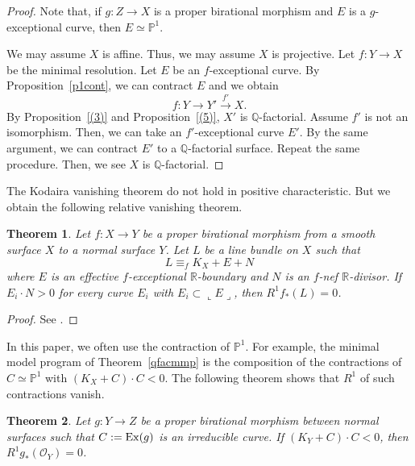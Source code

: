 \documentclass[12pt,twoside]{amsart}
\newtheorem{thm}{Theorem}[section]
\theoremstyle{definition}
\newcommand{\Q}{$\mathbb{Q}$}
\begin{document}
\begin{proof}
Note that, if $g:Z\to X$ is a proper birational morphism and 
$E$ is a $g$-exceptional curve, then $E\simeq \mathbb P^1.$ 

We may assume $X$ is affine. 
Thus, we may assume $X$ is projective. 
Let $f:Y\to X$ be the minimal resolution. 
Let $E$ be an $f$-exceptional curve. 
By Proposition~\ref{p1cont}, we can contract $E$ and 
we obtain 
$$f:Y\to Y'\overset{f'}\to X.$$
By Proposition~\ref{(3)} and Proposition~\ref{(5)}, 
$X'$ is \Q-factorial. 
Assume $f'$ is not an isomorphism. 
Then, we can take an $f'$-exceptional curve $E'$. 
By the same argument, we can contract $E'$ to a \Q-factorial surface. 
Repeat the same procedure. 
Then, we see $X$ is \Q-factorial. 
\end{proof}

The Kodaira vanishing theorem do not hold 
in positive characteristic. 
But we obtain the following relative vanishing theorem. 


\begin{thm}\label{relvanishing}
Let $f:X \to Y$ be a proper birational morphism 
from a smooth surface $X$ to a normal surface $Y$. 
Let $L$ be a line bundle on $X$ such that 
$$L \equiv_f K_X+E+N$$
where $E$ is an effective $f$-exceptional $\mathbb{R}$-boundary and 
$N$ is an $f$-nef $\mathbb{R}$-divisor. 
If $E_i\cdot N>0$ for every curve $E_i$ 
with $E_i\subset \llcorner E\lrcorner$, then $R^1f_*(L)=0$.
\end{thm}


\begin{proof}
See \cite[Section~2.2]{KK}.
\end{proof}

In this paper, 
we often use the contraction of $\mathbb{P}^1$. 
For example, 
the minimal model program of Theorem~\ref{qfacmmp} 
is the composition of the contractions of 
$C \simeq \mathbb{P}^1$ with $(K_X+C)\cdot C< 0$. 
The following theorem shows that 
$R^1$ of such contractions vanish. 


\begin{thm}\label{p1vanishing}
Let $g:Y \to Z$ be a proper birational morphism 
between normal surfaces 
such that $C:={\rm Ex}(g)$ is an irreducible curve. 
If $(K_Y+C)\cdot C< 0$, 
then $R^1g_*(\mathcal{O}_Y)=0$.
\end{thm}
\end{document}
